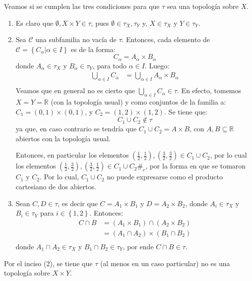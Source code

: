 \documentclass[12pt]{report}
\theoremstyle{largebreak}
\newcommand\contradiction{\ensuremath{\#_c}}
\begin{document}
    \begin{sol}
        Veamos si se cumplen las tres condiciones para que $\tau$ sea una topología sobre $X$.
        \begin{enumerate}
            \item Es claro que $\emptyset,X\times Y \in\tau$, pues $\emptyset\in\tau_X,\tau_Y$ y, $X\in\tau_X$ y $Y\in\tau_Y$.
            \item Sea $\mathcal{C}$ una subfamilia no vacía de $\tau$. Entonces, cada elemento de $\mathcal{C}=\left\{C_\alpha\big|\alpha\in I \right\}$ es de la forma:
            \begin{equation*}
                C_\alpha=A_\alpha\times B_\alpha
            \end{equation*}
            donde $A_\alpha\in \tau_X$ y $B_\alpha\in\tau_Y$, para todo $\alpha\in I$. Luego:
            \begin{equation*}
                \begin{split}
                    \bigcup_{\alpha\in I}C_\alpha&=\bigcup_{\alpha\in I}A_\alpha\times B_\alpha \\
                \end{split}
            \end{equation*}
            Veamos que en general no es cierto que $\bigcup_{\alpha\in I}C_\alpha\in\tau$. En efecto, tomemos $X=Y=\mathbb{R}$ (con la topología usual) y como conjuntos de la familia a: $C_1=(0,1)\times(0,1)$, y $C_2=(1,2)\times(1,2)$. Se tiene que:
            \begin{equation*}
                C_1\cup C_2\notin\tau
            \end{equation*}
            ya que, en caso contrario se tendría que $C_1\cup C_2=A\times B$, con $A,B\subseteq\mathbb{R}$ abiertos con la topología usual. 
            
            Entonces, en particular los elementos $(\frac{1}{2},\frac{1}{2}),(\frac{3}{2},\frac{3}{2})\in C_1\cup C_2$, por lo cual los elementos $(\frac{1}{2},\frac{3}{2}),(\frac{3}{2},\frac{1}{2})\in C_1\cup C_2$\contradiction, por la forma en que se tomaron $C_1$ y $C_2$. Por lo cual, $C_1\cup C_2$ no puede expresarse como el producto cartesiano de dos abiertos.
            \item Sean $C,D\in\tau$, es decir que $C=A_1\times B_1$ y $D=A_2\times B_2$, donde $A_i\in\tau_X$ y $B_i\in\tau_Y$ para $i\in\left\{1,2\right\}$. Entonces:
            \begin{equation*}
                \begin{split}
                    C\cap B&= (A_1\times B_1)\cap(A_2\times B_2)\\
                    &= (A_1\cap A_2)\times (B_1\cap B_2) \\
                \end{split}
            \end{equation*}
            donde $A_1\cap A_2\in\tau_X$ y $B_1\cap B_2\in\tau_Y$, por ende $C\cap B\in\tau$.
        \end{enumerate}
        Por el inciso (2), se tiene que $\tau$ (al menos en un caso particular) no es una topología sobre $X\times Y$.
    \end{sol}
\end{document}
